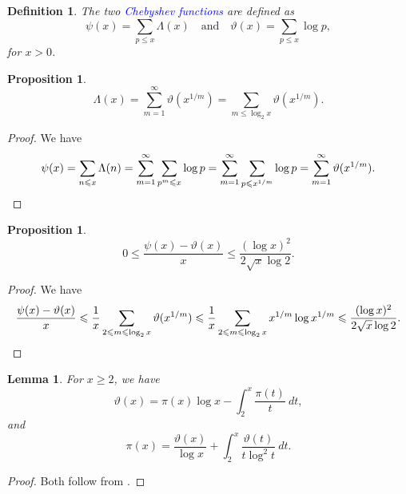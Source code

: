 \documentclass[12pt]{article}
\theoremstyle{thmstyle}
\newtheorem{lemma}[theorem]{Lemma}
\newtheorem{proposition}[theorem]{Proposition}
\theoremstyle{defstyle}
\newtheorem{definition}[theorem]{Definition}
\newcommand{\define}[1]{\textcolor{blue}{\textit{#1}}}
\renewcommand{\le}{\leqslant}
\renewcommand{\ge}{\geqslant}
\begin{document}
\begin{definition}
    The two \define{Chebyshev functions} are defined as 
    \begin{equation*}
        \psi(x) = \sum_{p\le x} \Lambda(x)\quad\text{and}\quad\vartheta(x) = \sum_{p\le x}\log p,
    \end{equation*}
    for $x > 0$.
\end{definition}

\begin{proposition}
    \begin{equation*}
        \Lambda(x) = \sum_{m = 1}^\infty\vartheta(x^{1/m}) = \sum_{m\le\log_2 x}\vartheta(x^{1/m}).
    \end{equation*}
\end{proposition}
\begin{proof}
    We have 
    \begin{equation*}
        \psi(x) = \sum_{n\le x}\Lambda(n) = \sum_{m = 1}^\infty\sum_{p^m\le x}\log p = \sum_{m = 1}^\infty\sum_{p\le x^{1/m}}\log p = \sum_{m = 1}^\infty\vartheta(x^{1/m}).\qedhere
    \end{equation*}
\end{proof}

\begin{proposition}
    \begin{equation*}
        0\le\frac{\psi(x) - \vartheta(x)}{x}\le\frac{(\log x)^2}{2\sqrt x\log 2}.
    \end{equation*}
\end{proposition}
\begin{proof}
    We have 
    \begin{equation*}
        \frac{\psi(x) - \vartheta(x)}{x}\le\frac{1}{x}\sum_{2\le m\le\log_2 x}\vartheta(x^{1/m})\le\frac{1}{x}\sum_{2\le m\le\log_2 x}x^{1/m}\log x^{1/m}\le\frac{(\log x)^2}{2\sqrt{x}\log 2}.\qedhere
    \end{equation*}
\end{proof}

\begin{lemma}
    For $x\ge 2$, we have 
    \begin{equation*}
        \vartheta(x) = \pi(x)\log x - \int_2^x\frac{\pi(t)}{t}~dt,
    \end{equation*}
    and 
    \begin{equation*}
        \pi(x) = \frac{\vartheta(x)}{\log x} + \int_{2}^x\frac{\vartheta(t)}{t\log^2 t}~dt.
    \end{equation*}
\end{lemma}
\begin{proof}
    Both follow from .
\end{proof}
\end{document}
